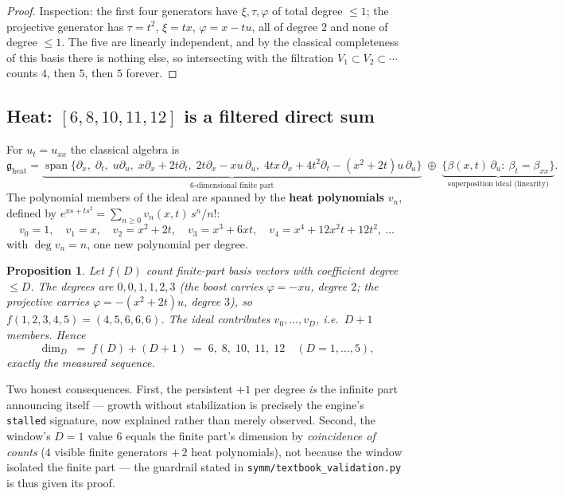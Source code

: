 \documentclass[11pt]{article}
\theoremstyle{plain}
\newtheorem{proposition}[theorem]{Proposition}
\theoremstyle{definition}
\theoremstyle{remark}
\newcommand{\g}{\mathfrak{g}}
\begin{document}
\begin{proof}
Inspection: the first four generators have $\xi,\tau,\varphi$ of total degree $\le1$; the projective
generator has $\tau=t^2$, $\xi=tx$, $\varphi=x-tu$, all of degree $2$ and none of degree $\le1$.
The five are linearly independent, and by the classical completeness of this basis there is nothing
else, so intersecting with the filtration $V_1\subset V_2\subset\cdots$ counts $4$, then $5$, then
$5$ forever.
\end{proof}

\subsection{Heat: $[6,8,10,11,12]$ is a filtered direct sum}

For $u_t=u_{xx}$ the classical algebra is
\[
\g_{\mathrm{heat}}=\underbrace{\operatorname{span}\{
\partial_x,\;\partial_t,\;u\partial_u,\;x\partial_x+2t\partial_t,\;
2t\partial_x-xu\,\partial_u,\;4tx\,\partial_x+4t^2\partial_t-(x^2{+}2t)u\,\partial_u\}}_{
\text{6-dimensional finite part}}
\;\oplus\;
\underbrace{\{\beta(x,t)\,\partial_u:\ \beta_t=\beta_{xx}\}}_{\text{superposition ideal (linearity)}} .
\]
The polynomial members of the ideal are spanned by the \textbf{heat polynomials} $v_n$, defined by
$e^{xs+ts^2}=\sum_{n\ge0}v_n(x,t)\,s^n/n!$:
\[
v_0=1,\quad v_1=x,\quad v_2=x^2+2t,\quad v_3=x^3+6xt,\quad v_4=x^4+12x^2t+12t^2,\ \dots
\]
with $\deg v_n=n$, one new polynomial per degree.

\begin{proposition}\label{prop:heat}
Let $f(D)$ count finite-part basis vectors with coefficient degree $\le D$. The degrees are
$0,0,1,1,2,3$ (the boost carries $\varphi=-xu$, degree $2$; the projective carries
$\varphi=-(x^2{+}2t)u$, degree $3$), so $f(1{,}2{,}3{,}4{,}5)=(4,5,6,6,6)$. The ideal contributes
$v_0,\dots,v_D$, i.e.\ $D+1$ members. Hence
\[
\dim_D \;=\; f(D)+(D+1) \;=\; 6,\;8,\;10,\;11,\;12\quad(D=1,\dots,5),
\]
exactly the measured sequence.
\end{proposition}

Two honest consequences. First, the persistent $+1$ per degree \emph{is} the infinite part announcing
itself --- growth without stabilization is precisely the engine's \texttt{stalled} signature, now
explained rather than merely observed. Second, the window's $D{=}1$ value $6$ equals the finite
part's dimension by \emph{coincidence of counts} ($4$ visible finite generators $+\,2$ heat
polynomials), not because the window isolated the finite part --- the guardrail stated in
\texttt{symm/textbook\_validation.py} is thus given its proof.
\end{document}
